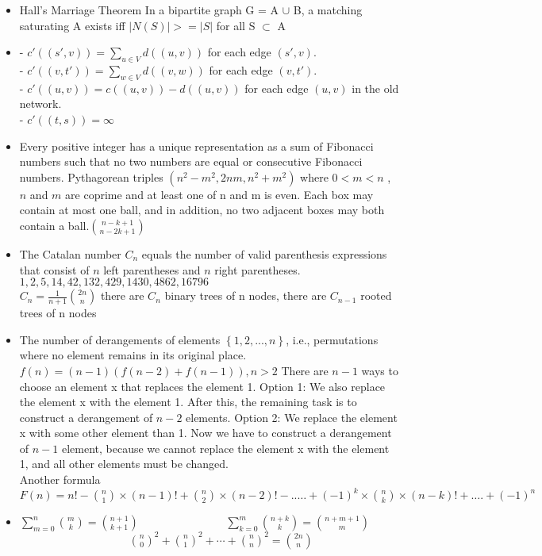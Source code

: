 \begin{itemize}
	\item  Hall’s Marriage Theorem In a bipartite
graph G = A $\cup$ B, a matching saturating A exists iff $|N(S)| >= |S|$ for all S $\subset$ A
	\item - $c'((s', v)) = \sum_{u \in V} d((u, v))$ for each edge $(s', v)$.\\
- $c'((v, t')) = \sum_{w \in V} d((v, w))$ for each edge $(v, t')$.\\
- $c'((u, v)) = c((u, v)) - d((u, v))$ for each edge $(u, v)$ in the old network.\\
- $c'((t, s)) = \infty$
\item Every positive integer has a unique representation as a sum of Fibonacci numbers such that no two numbers are equal or
consecutive Fibonacci numbers. Pythagorean triples $(n^2-m^2 , 2nm , n^2 + m^2) $ where $ 0<m<n$ , $n$ and $m$ are  coprime and at least one of n and m is even.  Each box may contain at most one ball, and in addition, no two
adjacent boxes may both contain a ball.${n-k+1}\choose{n-2k+1}$
\item The Catalan number $C_n$ equals the number of valid parenthesis expressions
that consist of $n$ left parentheses and $n$ right parentheses.
$1, 2, 5, 14, 42, 132, 429, 1430, 4862, 16796$\\
$C_n = \frac{1}{n+1} {{2n}\choose{n}}$
there are $C_n$ binary trees of n nodes,
there are $C_{n-1}$ rooted trees of n nodes
\item  The number of derangements of elements $\left\{1,2,...,n\right\}$,
i.e., permutations where no element remains in its original place.\\
$f (n) = (n-1)(f(n-2)+ f (n-1)) , n > 2$
There are $n-1$ ways to choose an element x that
replaces the element 1.
Option 1: We also replace the element x with the element 1. After this, the
remaining task is to construct a derangement of $n-2$ elements.
Option 2: We replace the element x with some other element than 1. Now we
have to construct a derangement of $n-1$ element, because we cannot replace the
element x with the element 1, and all other elements must be changed.\\
Another formula
$F(n) = n!-\binom{n}{1} \times (n-1)!+ \binom{n}{2} \times (n-2)!-..…+ (-1)^k \times \binom{n}{k} \times (n-k)!+….+(-1)^n$
\item $\sum_{m = 0}^n \binom{m}{k} = \binom{n + 1} {k + 1}$~~~~~~~~~~~~~~~ $\sum_{k = 0}^m  \binom {n + k} k = \binom {n + m + 1} m$ ~~~~~~~~~~~~~~~~~~~ ${\binom n 0}^2 + {\binom n 1}^2 + \cdots + {\binom n n}^2 = \binom {2n} n$

\end{itemize}
